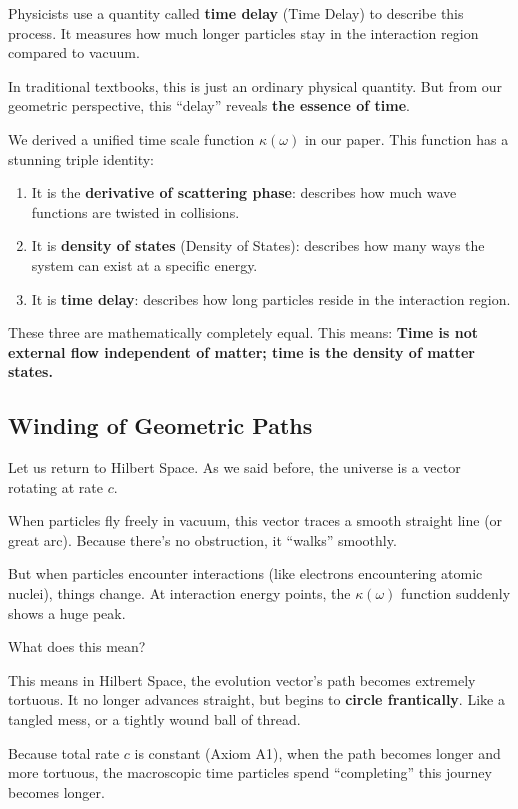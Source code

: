 Physicists use a quantity called \textbf{time delay} (Time Delay) to describe this process. It measures how much longer particles stay in the interaction region compared to vacuum.

In traditional textbooks, this is just an ordinary physical quantity. But from our geometric perspective, this ``delay'' reveals \textbf{the essence of time}.

We derived a unified time scale function $\kappa(\omega)$ in our paper. This function has a stunning triple identity:

\begin{enumerate}
\item It is the \textbf{derivative of scattering phase}: describes how much wave functions are twisted in collisions.

\item It is \textbf{density of states} (Density of States): describes how many ways the system can exist at a specific energy.

\item It is \textbf{time delay}: describes how long particles reside in the interaction region.
\end{enumerate}

These three are mathematically completely equal. This means: \textbf{Time is not external flow independent of matter; time is the density of matter states.}

\subsection{Winding of Geometric Paths}

Let us return to Hilbert Space. As we said before, the universe is a vector rotating at rate $c$.

When particles fly freely in vacuum, this vector traces a smooth straight line (or great arc). Because there's no obstruction, it ``walks'' smoothly.

But when particles encounter interactions (like electrons encountering atomic nuclei), things change. At interaction energy points, the $\kappa(\omega)$ function suddenly shows a huge peak.

What does this mean?

This means in Hilbert Space, the evolution vector's path becomes extremely tortuous. It no longer advances straight, but begins to \textbf{circle frantically}. Like a tangled mess, or a tightly wound ball of thread.

Because total rate $c$ is constant (Axiom A1), when the path becomes longer and more tortuous, the macroscopic time particles spend ``completing'' this journey becomes longer.

